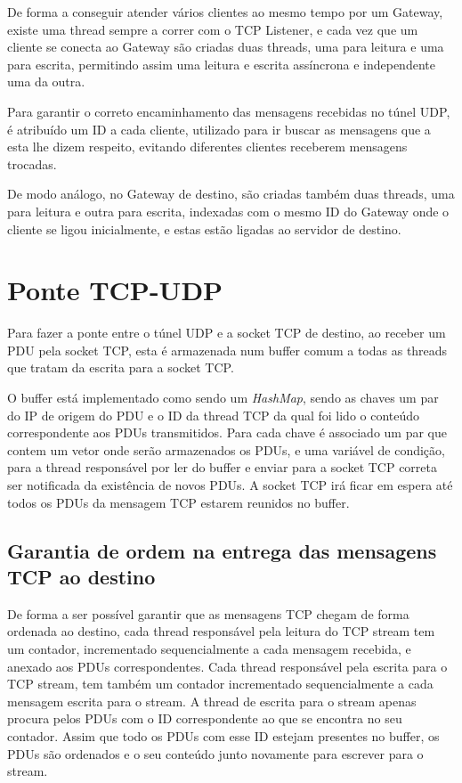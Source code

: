 \documentclass[a4paper]{report}
\begin{document}
De forma a conseguir atender vários clientes ao mesmo tempo por um Gateway,
existe uma thread sempre a correr com o TCP Listener, e cada vez que um cliente
se conecta ao Gateway são criadas duas threads, uma para leitura e uma para
escrita, permitindo assim uma leitura e escrita assíncrona e independente uma
da outra. 

Para garantir o correto encaminhamento das mensagens recebidas no 
túnel UDP, é atribuído um ID a cada cliente, utilizado para ir buscar
as mensagens que a esta lhe dizem respeito, evitando diferentes clientes
receberem mensagens trocadas.

De modo análogo, no Gateway de destino, são criadas também duas threads,
uma para leitura e outra para escrita, indexadas com o mesmo ID do Gateway 
onde o cliente se ligou inicialmente, e estas estão ligadas ao servidor 
de destino.

\section{Ponte TCP-UDP} \label{sec:tcp}

Para fazer a ponte entre o túnel UDP e a socket TCP de destino, ao receber
um PDU pela socket TCP, esta é armazenada num buffer comum a todas as threads
que tratam da escrita para a socket TCP.

O buffer está implementado como sendo um \textit{HashMap}, sendo as chaves um 
par do IP de origem do PDU e o ID da thread TCP da qual foi lido o conteúdo 
correspondente aos PDUs transmitidos. Para cada chave é associado um par que
contem um vetor onde serão armazenados os PDUs, e uma variável de condição,
para a thread responsável por ler do buffer e enviar para a socket TCP correta
ser notificada da existência de novos PDUs. A socket TCP irá ficar em espera
até todos os PDUs da mensagem TCP estarem reunidos no buffer.

\subsection{Garantia de ordem na entrega das mensagens TCP ao destino}

De forma a ser possível garantir que as mensagens TCP chegam de forma ordenada
ao destino, cada thread responsável pela leitura do TCP stream tem um contador,
incrementado sequencialmente a cada mensagem recebida, e anexado aos PDUs
correspondentes. Cada thread responsável pela escrita para o TCP stream, tem
também um contador incrementado sequencialmente a cada mensagem escrita para o
stream. A thread de escrita para o stream apenas procura pelos PDUs com o ID
correspondente ao que se encontra no seu contador. Assim que todo os PDUs com 
esse ID estejam presentes no buffer, os PDUs são ordenados e o seu conteúdo
junto novamente para escrever para o stream.
\end{document}
